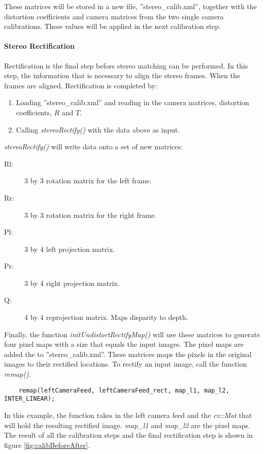 These matrices will be stored in a new file, ''stereo\_calib.xml'', together with the distortion coefficients and camera matrices from the two single camera calibrations. These values will be applied in the next calibration step.

\paragraph{Stereo Rectification}

Rectification is the final step before stereo matching can be performed. In this step, the information that is necessary to align the stereo frames. When the frames are aligned, Rectification is completed by:

\begin{enumerate}
	\item Loading ''stereo\_calib.xml'' and reading in the camera matrices, distortion coefficients, $R$ and $T$.
	\item Calling \textit{stereoRectify()} with the data above as input.
\end{enumerate}

 \textit{stereoRectify()} will write data onto a set of new matrices:

\begin{description}
	\item[Rl: ] 3 by 3 rotation matrix for the left frame.
	\item[Rr: ] 3 by 3 rotation matrix for the right frame.
	\item[Pl: ] 3 by 4 left projection matrix.
	\item[Pr: ] 3 by 4 right projection matrix.
	\item[Q: ] 4 by 4 reprojection matrix. Maps disparity to depth.

\end{description}

Finally, the function \textit{initUndistortRectifyMap()} will use these matrices to generate four pixel maps with a size that equals the input images. The pixel maps are added the to ''stereo\_calib.xml''. These matrices maps the pixels in the original images to their rectified locations. To rectify an input image, call the function \textit{remap()}.

\begin{verbatim}
	remap(leftCameraFeed, leftCameraFeed_rect, map_l1, map_l2, INTER_LINEAR);
\end{verbatim}

In this example, the function takes in the left camera feed and the \textit{cv::Mat} that will hold the resulting rectified image. \textit{map\_l1} and \textit{map\_l2} are the pixel maps. The result of all the calibration steps and the final rectification step is shown in figure \ref{fig:calibBeforeAfter}.

